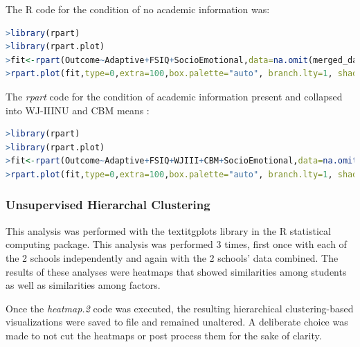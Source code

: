 \documentclass[twoside]{article}
\begin{document}
The R code for the condition of no academic information was:
\begin{lstlisting}[language=R]
>library(rpart)
>library(rpart.plot)
>fit<-rpart(Outcome~Adaptive+FSIQ+SocioEmotional,data=na.omit(merged_data), method="class",parms=list(prior=c(.3,.3,.4)),cost=c(3,1,1), control=rpart.control(minsplit=1,minbucket=1,cp=-1))
>rpart.plot(fit,type=0,extra=100,box.palette="auto", branch.lty=1, shadow.col="gray", nn=TRUE, under=TRUE,tweak=.75,main="Decision Tree (Academic Testing Absent)")
\end{lstlisting}

The \textit{rpart} code for the condition of academic information present and collapsed into WJ-IIINU and CBM means :
\begin{lstlisting}[language=R]
>library(rpart)
>library(rpart.plot)
>fit<-rpart(Outcome~Adaptive+FSIQ+WJIII+CBM+SocioEmotional,data=na.omit(OHdata), method="class",parms=list(prior=c(.3,.3,.4)),cost=c(3,1,2,2,1),control=rpart.control(minsplit=1, minbucket=1,cp=-1, mincriterion=.5))
>rpart.plot(fit,type=0,extra=100,box.palette="auto", branch.lty=1, shadow.col="gray", nn=TRUE, under=TRUE,tweak=.75,main="Decision Tree (Academic Testing Present)")
\end{lstlisting}

\subsubsection{Unsupervised Hierarchal Clustering}

This analysis was performed with the textit{gplots} library in the R statistical computing package. This analysis was performed 3 times, first once with each of the 2 schools independently and again with the 2 schools' data combined. The results of these analyses were heatmaps that showed similarities among students as well as similarities among factors.

Once the \textit{heatmap.2} code was executed, the resulting hierarchical clustering-based visualizations were saved to file and remained unaltered. A deliberate choice was made to not cut the heatmaps or post process them for the sake of clarity. 
\end{document}
